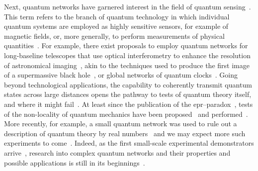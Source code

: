 Next, quantum networks have garnered interest in the field of quantum sensing~\cite{Eldredge2018}.
This term refers to the branch of quantum technology in which individual quantum systems are employed as highly sensitive sensors, for example of magnetic fields, or, more generally, to perform measurements of physical quantities~\cite{Giovannetti2004,Degen2017}.
For example, there exist proposals to employ quantum networks for long-baseline telescopes that use optical interferometry to enhance the resolution of astronomical imaging~\cite{Gottesman2012,Khabiboulline2019}, akin to the techniques used to produce the first image of a supermassive black hole~\cite{TheEventHorizonTelescopeCollaboration2019}, or global networks of quantum clocks~\cite{Komar2014}.
Going beyond technological applications, the capability to coherently transmit quantum states across large distances opens the pathway to tests of quantum theory itself, and where it might fail~\cite{Weinberg1989}.
At least since the publication of the \gls{epr}--paradox~\cite{Einstein1935}, tests of the non-locality of quantum mechanics have been proposed~\cite{Bell1964,Clauser1969} and performed~\cite{Hensen2015,Storz2023}.
More recently, for example, a small quantum network was used to rule out a description of quantum theory by real numbers~\cite{Li2022} and we may expect more such experiments to come~\cite{Shadbolt2014}.
Indeed, as the first small-scale experimental demonstrators arrive~\cite{Knaut2024,Liu2024,Kucera2024,Stolk2024}, research into complex quantum networks and their properties and possible applications is still in its beginnings~\cite{Nokkala2024}.


